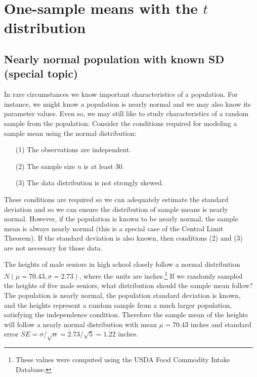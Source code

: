 
\section{One-sample means with the $t$ distribution}
\label{oneSampleMeansWithTDistribution}

\subsection[Nearly normal population with known SD]{Nearly normal population with known SD (special topic)}
\label{nearlyNormalPopWithKnownSD}


In rare circumstances we know important characteristics of a population. For instance, we might know a population is nearly normal and we may also know its parameter values. Even so, we may still like to study characteristics of a random sample from the population. Consider the conditions required for modeling a sample mean using the normal distribution:
\begin{enumerate}
\setlength{\itemsep}{0mm}
\item[(1)] The observations are independent.
\item[(2)] The sample size $n$ is at least 30.
\item[(3)] The data distribution is not strongly skewed.
\end{enumerate}
These conditions are required so we can adequately estimate the standard deviation and so we can ensure the distribution of sample means is nearly normal. However, if the population is known to be nearly normal, the sample mean is always nearly normal (this is a special case of the Central Limit Theorem). If the standard deviation is also known, then conditions (2) and (3) are not necessary for those data.

\begin{example}{The heights of male seniors in high school closely follow a normal distribution $N(\mu=70.43, \sigma=2.73)$, where the units are inches.\footnote{These values were computed using the USDA Food Commodity Intake Database.} If we randomly sampled the heights of five male seniors, what distribution should the sample mean follow?}\label{simpleSampleOfFiveMaleSeniors}
The population is nearly normal, the population standard deviation is known, and the heights represent a random sample from a much larger population, satisfying the independence condition. Therefore the sample mean of the heights will follow a nearly normal distribution with mean $\mu=70.43$ inches and standard error $SE=\sigma/\sqrt{n} = 2.73/\sqrt{5}=1.22$ inches.
\end{example}

